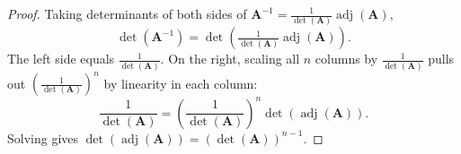 \begin{proof}
  Taking determinants of both sides of $\mathbf{A}^{-1} = \tfrac{1}{\det(\mathbf{A})} \operatorname{adj}(\mathbf{A})$,
  \[
    \det(\mathbf{A}^{-1})
    = \det\!\left(\tfrac{1}{\det(\mathbf{A})} \operatorname{adj}(\mathbf{A})\right).
  \]
  The left side equals $\tfrac{1}{\det(\mathbf{A})}$. On the right, scaling all $n$ columns by $\tfrac{1}{\det(\mathbf{A})}$ pulls out $\left(\tfrac{1}{\det(\mathbf{A})}\right)^n$ by linearity in each column:
  \[
    \frac{1}{\det(\mathbf{A})}
    = \left(\frac{1}{\det(\mathbf{A})}\right)^n \det(\operatorname{adj}(\mathbf{A})).
  \]
  Solving gives $\det(\operatorname{adj}(\mathbf{A})) = (\det(\mathbf{A}))^{n-1}$.
\end{proof}
